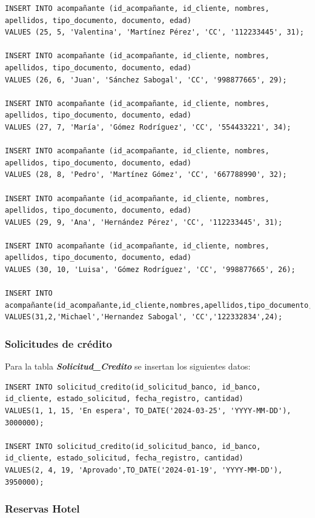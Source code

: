 \documentclass{article}
\begin{document}
\begin{lstlisting}
INSERT INTO acompañante (id_acompañante, id_cliente, nombres, apellidos, tipo_documento, documento, edad)
VALUES (25, 5, 'Valentina', 'Martínez Pérez', 'CC', '112233445', 31);

INSERT INTO acompañante (id_acompañante, id_cliente, nombres, apellidos, tipo_documento, documento, edad)
VALUES (26, 6, 'Juan', 'Sánchez Sabogal', 'CC', '998877665', 29);

INSERT INTO acompañante (id_acompañante, id_cliente, nombres, apellidos, tipo_documento, documento, edad)
VALUES (27, 7, 'María', 'Gómez Rodríguez', 'CC', '554433221', 34);

INSERT INTO acompañante (id_acompañante, id_cliente, nombres, apellidos, tipo_documento, documento, edad)
VALUES (28, 8, 'Pedro', 'Martínez Gómez', 'CC', '667788990', 32);

INSERT INTO acompañante (id_acompañante, id_cliente, nombres, apellidos, tipo_documento, documento, edad)
VALUES (29, 9, 'Ana', 'Hernández Pérez', 'CC', '112233445', 31);

INSERT INTO acompañante (id_acompañante, id_cliente, nombres, apellidos, tipo_documento, documento, edad)
VALUES (30, 10, 'Luisa', 'Gómez Rodríguez', 'CC', '998877665', 26);

INSERT INTO acompañante(id_acompañante,id_cliente,nombres,apellidos,tipo_documento,documento,edad)
VALUES(31,2,'Michael','Hernandez Sabogal', 'CC','122332834',24);
\end{lstlisting}

\subsubsection{Solicitudes de crédito}

Para la tabla \textit{\textbf{Solicitud\_Credito}} se insertan los siguientes datos:

\begin{lstlisting}
INSERT INTO solicitud_credito(id_solicitud_banco, id_banco, id_cliente, estado_solicitud, fecha_registro, cantidad)
VALUES(1, 1, 15, 'En espera', TO_DATE('2024-03-25', 'YYYY-MM-DD'), 3000000);

INSERT INTO solicitud_credito(id_solicitud_banco, id_banco, id_cliente, estado_solicitud, fecha_registro, cantidad)
VALUES(2, 4, 19, 'Aprovado',TO_DATE('2024-01-19', 'YYYY-MM-DD'), 3950000);
\end{lstlisting}



\subsubsection{Reservas Hotel}
\end{document}
